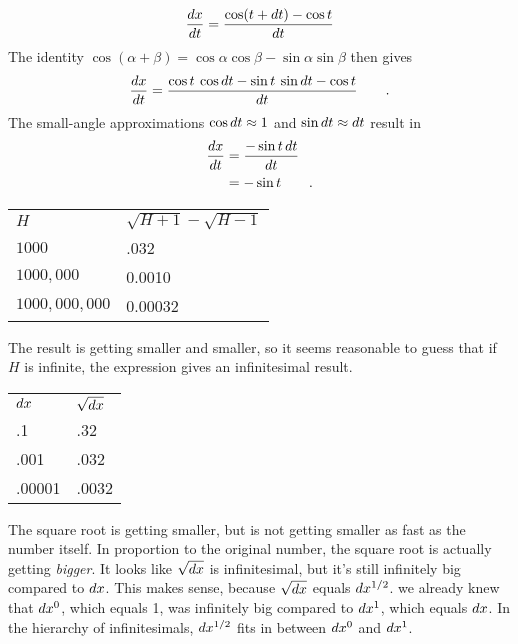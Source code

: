 
\begin{equation*}
  \frac{\mathop{d\!} x}{\mathop{d\!} t} = \frac{\cos(t+\mathop{d\!} t)-\cos t}{\mathop{d\!} t}
\end{equation*}
The identity $\cos(\alpha+\beta)=\cos\alpha\cos\beta-\sin\alpha\sin\beta$ then gives
\begin{equation*}
  \frac{\mathop{d\!} x}{\mathop{d\!} t} = \frac{\cos t \: \cos \mathop{d\!} t - \sin t \: \sin \mathop{d\!} t - \cos t}{\mathop{d\!} t} \qquad .\\
\end{equation*}
The small-angle approximations  $\cos \mathop{d\!} t\approx 1$ and $\sin \mathop{d\!} t\approx \mathop{d\!} t$
result in
\begin{align*}
\frac{\mathop{d\!} x}{\mathop{d\!} t}   &= \frac{-\sin t \mathop{d\!} t}{\mathop{d\!} t} \\
                        &= -\sin t \qquad .
\end{align*}


\begin{tabular}{ll}
$H$ & $\sqrt{H+1}-\sqrt{H-1}$ \\
$1000$ & .032 \\
$1000,000$ & 0.0010 \\
$1000,000,000$ & 0.00032 
\end{tabular}

The result is getting smaller and smaller, so it seems reasonable to guess that if $H$ is infinite,
the expression gives an infinitesimal result.


\begin{tabular}{ll}
$\mathop{d\!} x$ & $\sqrt{\mathop{d\!} x}$ \\
.1 & .32 \\
.001 & .032 \\
.00001 & .0032
\end{tabular}

The square root is getting smaller, but is not getting smaller as fast as the number itself.
In proportion to the original number, the square root is actually getting \emph{bigger}. It
looks like $\sqrt{\mathop{d\!} x}$ is infinitesimal, but it's still infinitely big compared to
$\mathop{d\!} x$. This makes sense, because $\sqrt{\mathop{d\!} x}$ equals $\mathop{d\!} x^{1/2}$.
we already knew that $\mathop{d\!} x^0$, which equals 1, was
infinitely big compared to $\mathop{d\!} x^1$, which equals $\mathop{d\!} x$.
In the hierarchy of infinitesimals, $\mathop{d\!} x^{1/2}$ fits in between $\mathop{d\!} x^0$
and  $\mathop{d\!} x^1$.

